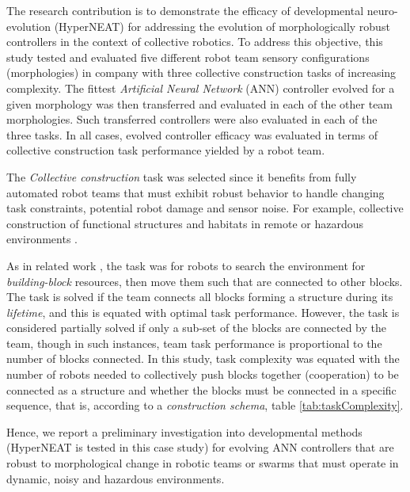 \documentclass[conference]{IEEEtran}
\begin{document}
The research contribution is to demonstrate the efficacy of developmental neuro-evolution (HyperNEAT) for
addressing the evolution of morphologically robust controllers in the context of collective robotics.
To address this objective, this study tested and evaluated five different robot team sensory configurations
(morphologies) in company with three collective construction tasks of increasing complexity.  The fittest
\textit{Artificial Neural Network} (ANN) controller evolved for a given morphology was then transferred and
evaluated in each of the other team morphologies.  Such transferred controllers were also evaluated in
each of the three tasks.  In all cases, evolved controller efficacy was evaluated in terms of
collective construction task performance yielded by a robot team.

The \textit{Collective construction} task \cite{WerfelPetersenNagpal2014} was selected since it benefits
from fully automated robot teams that must exhibit robust behavior to handle changing task constraints,
potential robot damage and sensor noise.
For example, collective construction of functional structures and habitats in remote or hazardous
environments \cite{WerfelNagpal2008}.

As in related work \cite{WerfelPetersenNagpal2014}, the task was for robots to search the environment
for \textit{building-block} resources, then move them such that are connected to other blocks.
The task is
solved if the team connects all blocks forming a structure during its \textit{lifetime}, and this is equated
with optimal task performance.
However, the task is considered partially solved if only a sub-set of the blocks are connected by the team,
though in such instances, team task performance is proportional to the number of blocks connected.
In this study, task complexity was equated with the number of robots needed
to collectively push blocks together (cooperation) to be connected as a structure and whether the blocks
must be connected in a specific sequence, that is, according to a \textit{construction schema},
table \ref{tab:taskComplexity}.

Hence, we report a preliminary investigation into developmental methods (HyperNEAT is tested in this case
study) for evolving ANN controllers that are robust to morphological change in robotic teams or swarms that
must operate in dynamic, noisy and hazardous environments.
\end{document}
